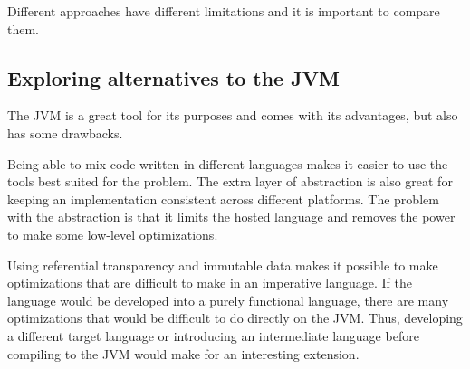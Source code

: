 Different approaches have different limitations and it is important to compare them.

\subsection{Exploring alternatives to the JVM}

The JVM is a great tool for its purposes and comes with its advantages, but also has some drawbacks.

Being able to mix code written in different languages makes it easier to use the tools best suited for the problem. The extra layer of abstraction is also great for keeping an implementation consistent across different platforms. The problem with the abstraction is that it limits the hosted language and removes the power to make some low-level optimizations. 

Using referential transparency and immutable data makes it possible to make optimizations that are difficult to make in an imperative language. If the language would be developed into a purely functional language, there are many optimizations that would be difficult to do directly on the JVM. Thus, developing a different target language or introducing an intermediate language before compiling to the JVM would make for an interesting extension.
